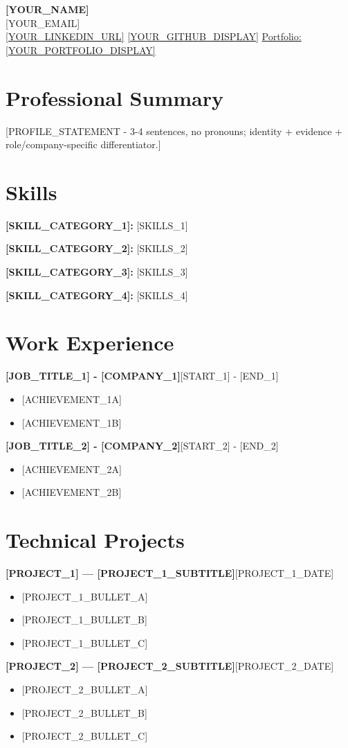 \documentclass[10pt,a4paper]{article}
\newcommand{\entry}[2]{\textbf{#1}\hspace{1em}\hfill #2\par}
\newcommand{\project}[2]{\textbf{#1}\hspace{1em}\hfill #2\par}
\newcommand{\skillrow}[2]{{\raggedright\textbf{#1:} #2\par}}
\newlength{\entrygapsize}\setlength{\entrygapsize}{6pt}
\newcommand{\entrygap}{\vspace{\entrygapsize}}
\begin{document}
\begin{center}
  {\LARGE\bfseries [YOUR_NAME]}\\[3pt]
  [YOUR_EMAIL]  \\[1pt]
  \href{[YOUR_LINKEDIN_URL]}{[YOUR_LINKEDIN_URL]} \quad \href{[YOUR_GITHUB_URL]}{[YOUR_GITHUB_DISPLAY]} \quad \href{[YOUR_PORTFOLIO_URL]}{Portfolio: [YOUR_PORTFOLIO_DISPLAY]}
\end{center}
\vspace{-6pt}

\section{Professional Summary}
[PROFILE_STATEMENT - 3-4 sentences, no pronouns; identity + evidence + role/company-specific differentiator.]

\section{Skills}
\skillrow{[SKILL_CATEGORY_1]}{[SKILLS_1]}
\skillrow{[SKILL_CATEGORY_2]}{[SKILLS_2]}
\skillrow{[SKILL_CATEGORY_3]}{[SKILLS_3]}
\skillrow{[SKILL_CATEGORY_4]}{[SKILLS_4]}

\section{Work Experience}
\entry{[JOB_TITLE_1] - [COMPANY_1]}{[START_1] - [END_1]}
\begin{itemize}
  \item {[ACHIEVEMENT_1A]}
  \item {[ACHIEVEMENT_1B]}
\end{itemize}
\entrygap
\entry{[JOB_TITLE_2] - [COMPANY_2]}{[START_2] - [END_2]}
\begin{itemize}
  \item {[ACHIEVEMENT_2A]}
  \item {[ACHIEVEMENT_2B]}
\end{itemize}

\section{Technical Projects}
\project{[PROJECT_1] --- [PROJECT_1_SUBTITLE]}{[PROJECT_1_DATE]}
\begin{itemize}
  \item {[PROJECT_1_BULLET_A]}
  \item {[PROJECT_1_BULLET_B]}
  \item {[PROJECT_1_BULLET_C]}
\end{itemize}
\entrygap
\project{[PROJECT_2] --- [PROJECT_2_SUBTITLE]}{[PROJECT_2_DATE]}
\begin{itemize}
  \item {[PROJECT_2_BULLET_A]}
  \item {[PROJECT_2_BULLET_B]}
  \item {[PROJECT_2_BULLET_C]}
\end{itemize}
\end{document}
